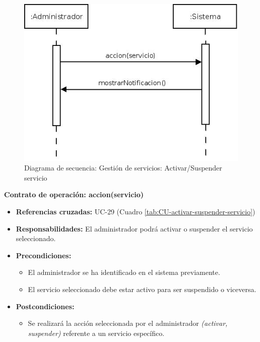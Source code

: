 \begin{figure}[h!]
\centering
  \includegraphics[scale=.55]{img/secuencias/gestion-servicios-suspender-activar-servicio.jpeg}
  \caption{Diagrama de secuencia: Gestión de servicios: Activar/Suspender servicio}
  \label{fig:secuencia-gestion-servicios-suspender-activar-servicio}
\end{figure}

\textbf{Contrato de operación: accion(servicio)}
\begin{itemize}
\item \textbf{Referencias cruzadas:} UC-29 (Cuadro \ref{tab:CU-activar-suspender-servicio})
\item \textbf{Responsabilidades:} El administrador podrá activar o suspender el servicio seleccionado.
\item \textbf{Precondiciones:} 
 \begin{itemize}
\item El administrador se ha identificado en el sistema previamente.
\item El servicio seleccionado debe estar activo para ser suspendido o viceversa.
\end {itemize}
\item \textbf{Postcondiciones:} 
 \begin{itemize}
\item Se realizará la acción seleccionada por el administrador \textit{(activar, suspender)} referente a un servicio específico.
\end {itemize}
\end {itemize}

